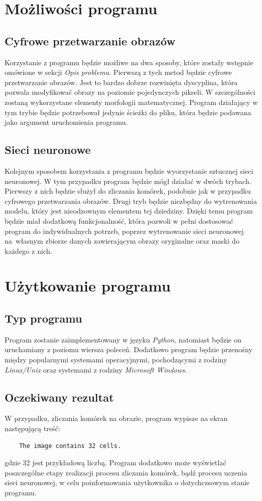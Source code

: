 \documentclass[a4paper]{article}
\begin{document}
\section{Możliwości programu}
\subsection{Cyfrowe przetwarzanie obrazów}
Korzystanie z programu będzie możliwe na dwa sposoby, które zostały wstępnie omówione w sekcji \textit{Opis problemu}. Pierwszą z tych metod będzie cyfrowe przetwarzanie obrazów. Jest to bardzo dobrze rozwinięta dyscyplina, która pozwala modyfikować obrazy na poziomie pojedynczych pikseli. W szczególności zostaną wykorzystane elementy morfologii matematycznej. Program działający w tym trybie będzie potrzebował jedynie ścieżki do pliku, która będzie podawana jako argument uruchomienia programu.
\subsection{Sieci neuronowe}
Kolejnym sposobem korzystania z programu będzie wyorzystanie sztucznej sieci neuronowej. W tym przypadku program będzie mógł działać w dwóch trybach. Pierwszy z nich będzie służył do zliczania komórek, podobnie jak w przypadku cyfrowego przetwarzania obrazów. Drugi tryb będzie niezbędny do wytrenowania modelu, który jest nieodzownym elementem tej dziedziny. Dzięki temu program będzie miał dodatkową funkcjonalność, która pozwoli w pełni dostosować program do indywidualnych potrzeb, poprzez wytrenowanie sieci neuronowej na~własnym zbiorze danych zawierającym obrazy oryginalne oraz maski do każdego z nich.
\section{Użytkowanie programu}
\subsection{Typ programu}
Program zostanie zaimplementowany w języku \textit{Python}, natomiast będzie on uruchamiany z poziomu wiersza poleceń. Dodatkowo program będzie przenośny między popularnymi systemami operacyjnymi, pochodzącymi z rodziny \textit{Linux/Unix} oraz systemami z rodziny \textit{Microsoft Windows}.
\subsection{Oczekiwany rezultat}
W przypadku, zliczania komórek na obrazie, program wypisze na ekran następującą treść:
\begin{verbatim}    The image contains 32 cells.\end{verbatim}
gdzie 32 jest przykładową liczbą.
\newline
\newline
Program dodatkowo może wyświetlać poszczególne etapy realizacji procesu zliczania komórek, bądź procesu uczenia sieci neuronowej, w celu poinformowania użytkownika o dotychczsowym stanie programu.
\end{document}
